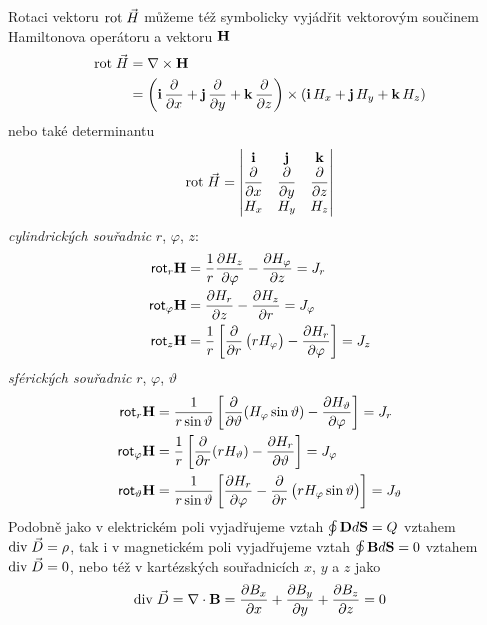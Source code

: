       Rotaci vektoru $\mathrm{rot}\;\vec{H}$ můžeme též symbolicky vyjádřit vektorovým součinem Hamiltonova
      operátoru a vektoru $\mathbf{H}$
      \begin{align*} %
        \rot{H}  &= \nabla\times\vr{H}                                                      \\
                 &= \left(\vr{i}\,\pder{ }{x} + 
                   \vr{j}\,\pder{ }{y} + \vr{k}\,\pder{ }{z}\right)\times(\vr{i}\,H_x +
                   \vr{j}\,H_y + \vr{k}\,H_z)
      \end{align*}
      nebo také determinantu
      \begin{equation}\label{TEMP:eq_amp_z8}
        \mathrm{rot}\;\vec{H} = \begin{vmatrix}
                    \mathbf{i}       & \mathbf{j}      & \mathbf{k}      \\
                    \dfrac{\partial  }{\partial x}  & \dfrac{\partial  }{\partial y} & \dfrac{\partial  }{\partial z} \\ 
                    H_x          & H_y         & H_z         \\
                  \end{vmatrix}      
      \end{equation}  
      \emph{cylindrických souřadnic} $r$, $\varphi$, $z$:
      \begin{align}\label{TEMP:eq_amp_z9}
        \textsf{rot}_r\mathbf{H}       
          &= \frac{1}{r}\dfrac{\partial H_z}{\partial \varphi} - \dfrac{\partial H_\varphi}{\partial z} = J_r           \nonumber \\ 
        \textsf{rot}_\varphi\mathbf{H} 
          &= \dfrac{\partial H_r}{\partial z} - \dfrac{\partial H_z}{\partial r}                        = J_\varphi     \nonumber \\
        \textsf{rot}_z\mathbf{H}       
          &= \frac{1}{r}\left[\dfrac{\partial  }{\partial r}
             \left(rH_\varphi\right)-\dfrac{\partial H_r}{\partial \varphi}\right]   = J_z
      \end{align} 
      \emph{sférických souřadnic} $r$, $\varphi$, $\vartheta$ 
      \begin{align}\label{TEMP:eq_amp_z10}
        \textsf{rot}_r\mathbf{H}        
           &= \frac{1}{r\sin\vartheta}\left[\dfrac{\partial  }{\partial \vartheta}(H_\varphi\sin\vartheta) - 
              \dfrac{\partial H_\vartheta}{\partial \varphi}\right]                     = J_r           \nonumber \\ 
        \textsf{rot}_\varphi\mathbf{H}   
           &= \frac{1}{r}\left[\dfrac{\partial  }{\partial r}(rH_\vartheta) - 
              \dfrac{\partial H_r}{\partial \vartheta}\right]                           = J_\varphi     \nonumber \\
        \textsf{rot}_\vartheta\mathbf{H} 
           &= \frac{1}{r\sin\vartheta}\left[\dfrac{\partial H_r}{\partial \varphi} -
              \dfrac{\partial  }{\partial r}\left(rH_\varphi\sin\vartheta\right)\right] = J_\vartheta    
    \end{align} 
      Podobně jako v elektrickém poli vyjadřujeme vztah $\oint\mathbf{D}d\mathbf{S} = Q$ vztahem $\mathrm{div}\;\vec{D}
      = \rho$, tak i v magnetickém poli vyjadřujeme vztah $\oint\mathbf{B}d\mathbf{S} = 0$ vztahem
      $\mathrm{div}\;\vec{D} = 0$, nebo též v kartézských souřadnicích $x$, $y$ a $z$ jako $$\mathrm{div}\;\vec{D} =
      \nabla\cdot\mathbf{B} = \dfrac{\partial B_x}{\partial x} + \dfrac{\partial B_y}{\partial y} + \dfrac{\partial B_z}{\partial z} = 0$$
                     
